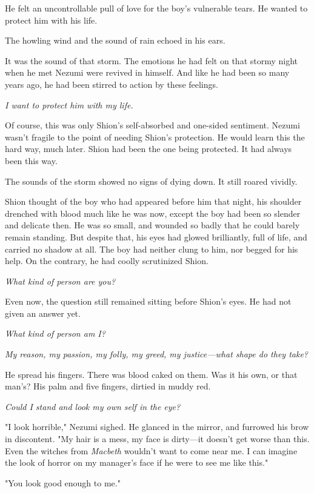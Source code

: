 He felt an uncontrollable pull of love for the boy's vulnerable tears.
He wanted to protect him with his life.

The howling wind and the sound of rain echoed in his ears.

It was the sound of that storm. The emotions he had felt on that stormy
night when he met Nezumi were revived in himself. And like he had been
so many years ago, he had been stirred to action by these feelings.

\emph{I want to protect him with my life.}

Of course, this was only Shion's self-absorbed and one-sided sentiment.
Nezumi wasn't fragile to the point of needing Shion's protection. He
would learn this the hard way, much later. Shion had been the one being
protected. It had always been this way.

The sounds of the storm showed no signs of dying down. It still roared
vividly.

Shion thought of the boy who had appeared before him that night, his
shoulder drenched with blood much like he was now, except the boy had
been so slender and delicate then. He was so small, and wounded so badly
that he could barely remain standing. But despite that, his eyes had
glowed brilliantly, full of life, and carried no shadow at all. The boy
had neither clung to him, nor begged for his help. On the contrary, he
had coolly scrutinized Shion.

\emph{What kind of person are you?}

Even now, the question still remained sitting before Shion's eyes. He
had not given an answer yet.

\emph{What kind of person am I?}

\emph{My reason, my passion, my folly, my greed, my justice---what shape do they
take?}

He spread his fingers. There was blood caked on them. Was it his own, or
that man's? His palm and five fingers, dirtied in muddy red.

\emph{Could I stand and look my own self in the eye?}

"I look horrible," Nezumi sighed. He glanced in the mirror, and furrowed
his brow in discontent. "My hair is a mess, my face is dirty---it doesn't
get worse than this. Even the witches from \emph{Macbeth} wouldn't want to come
near me. I can imagine the look of horror on my manager's face if he
were to see me like this."

"You look good enough to me."

